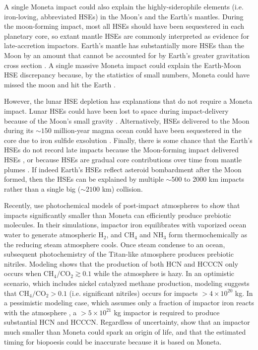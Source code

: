 \documentclass[preprint]{aastex63}
\begin{document}
A single Moneta impact could also explain the highly-siderophile elements (i.e. iron-loving, abbreviated HSEs) in the Moon's and the Earth's mantles. During the moon-forming impact, most all HSEs should have been sequestered in each planetary core, so extant mantle HSEs are commonly interpreted as evidence for late-accretion impactors. Earth's mantle has substantially more HSEs than the Moon by an amount that cannot be accounted for by Earth's greater gravitation cross section \citep{Day_2015}. A single massive Moneta impact could explain the Earth-Moon HSE discrepancy because, by the statistics of small numbers, Moneta could have missed the moon and hit the Earth \citep{Bottke_2010}.

However, the lunar HSE depletion has explanations that do not require a Moneta impact. Lunar HSEs could have been lost to space during impact-delivery because of the Moon's small gravity \citep{Kraus_2015}. Alternatively, HSEs delivered to the Moon during its $\sim 150$ million-year magma ocean could have been sequestered in the core due to iron sulfide exsolution \citep{Morbidelli_2018,Rubie_2016}. Finally, there is some chance that the Earth's HSEs do not record late impacts because the Moon-forming impact delivered HSEs \citep{Sleep_2016}, or because HSEs are gradual core contributions over time from mantle plumes \citep{Halliday_2023,Mundl_2020}. If indeed Earth's HSEs reflect asteroid bombardment after the Moon formed, then the HSEs can be explained by multiple $\sim 500$ to 2000 km impacts rather than a single big ($\sim 2100$ km) collision.

Recently, \citep{Wogan_2023} use photochemical models of post-impact atmospheres to show that impacts significantly smaller than Moneta can efficiently produce prebiotic molecules. In their simulations, impactor iron equilibrates with vaporized ocean water to generate atmospheric H$_2$, and CH$_4$ and NH$_3$ form thermochemically as the reducing steam atmosphere cools. Once steam condense to an ocean, subsequent photochemistry of the Titan-like atmosphere produces prebiotic nitriles. Modeling shows that the production of both HCN and HCCCN only occurs when $\mathrm{CH_4} / \mathrm{CO_2} \gtrsim 0.1$ while the atmosphere is hazy. In an optimistic scenario, which includes nickel catalyzed methane production, modeling suggests that $\mathrm{CH_4} / \mathrm{CO_2} > 0.1$ (i.e. significant nitriles) occurs for impacts $> 4 \times 10^{20}$ kg. In a pessimistic modeling case, which assumes only a fraction of impactor iron reacts with the atmosphere \citep{Citron_2022}, a $> 5 \times 10^{21}$ kg impactor is required to produce substantial HCN and HCCCN. Regardless of uncertainty, \citet{Wogan_2023} show that an impactor much smaller than Moneta could spark an origin of life, and that the \citet{Benner_2020} estimated timing for biopoesis could be inaccurate because it is based on Moneta.
\end{document}
